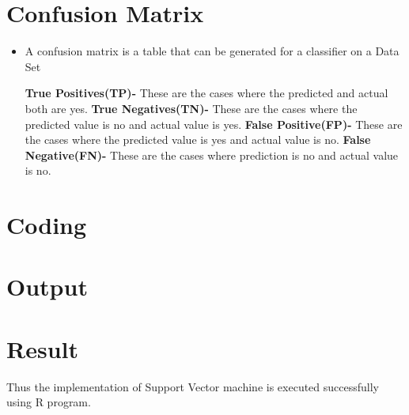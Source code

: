 \documentclass[a4paper,10pt]{article}
\newcommand{\algrule}[1][.2pt]{\par\vskip.5\baselineskip\hrule height #1\par\vskip.5\baselineskip}
\begin{document}
\begin{itemize}

\end{itemize}

\newpage
\section{Confusion Matrix}
\begin{itemize}
\item A confusion matrix is a table that can be generated for a classifier on a Data Set 

\textbf{True Positives(TP)-} These are the cases where the predicted and actual both are yes.
\linebreak
\textbf{True Negatives(TN)-} These are the cases where the predicted value is no and actual value is yes.
\linebreak
\textbf{False Positive(FP)-} These are the cases where the predicted value is yes and actual value is no.
\linebreak
\textbf{False Negative(FN)-} These are the cases where prediction is no and actual value is no.
\end{itemize}

\section{Coding}


\section{Output} 


\section{Result}
Thus the implementation of Support Vector machine is executed successfully using R program.
\end{document}
